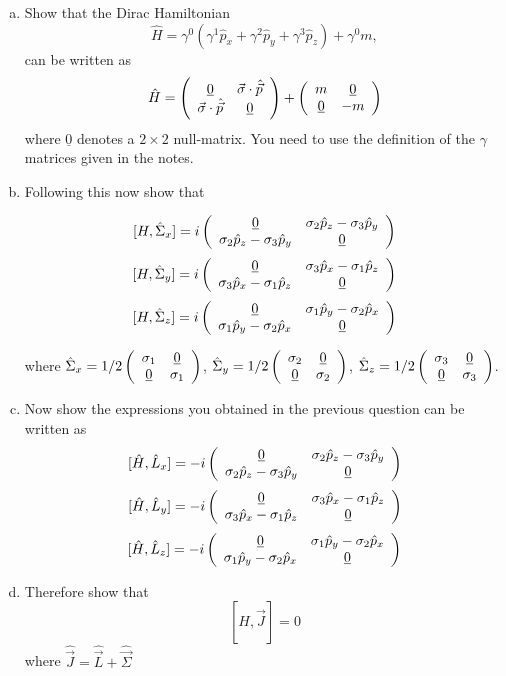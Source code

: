 \begin{enumerate}[(a)]
\item Show that the Dirac Hamiltonian
\[ \hat{H} = \gamma^{0}(\gamma^1\hat{p}_x+ \gamma^2\hat{p}_y + \gamma^3\hat{p}_z)+\gamma^{0}m, \]
can be written as
\[
\hat{H}= \left( \begin{array}{cc} \underline{0} & \vec{\sigma}\cdot\hat{\vec{p}} \\ \vec{\sigma}\cdot\hat{\vec{p}} & \underline{0} \end{array} \right)+
 \left( \begin{array}{cc} m & \underline{0} \\ \underline{0} & -m \end{array} \right)
\]
where $\underline{0}$ denotes a $2\times2$ null-matrix.
You need to use the definition of the $\gamma$ matrices given in the notes.

\item Following this now show that

\[ [H,\hat{\Sigma}_x]=i \left( \begin{array}{cc} \underline{0} & \sigma_2\hat{p}_{z}-\sigma_3\hat{p}_{y} \\ \sigma_2\hat{p}_{z}-\sigma_3\hat{p}_{y} & \underline{0} \end{array} \right) \]
\[ [H,\hat{\Sigma}_y]=i \left( \begin{array}{cc} \underline{0} & \sigma_3\hat{p}_{x}-\sigma_1\hat{p}_{z} \\ \sigma_3\hat{p}_{x}-\sigma_1\hat{p}_{z} & \underline{0} \end{array} \right) \]
\[ [H,\hat{\Sigma}_z]=i \left( \begin{array}{cc} \underline{0} & \sigma_1\hat{p}_{y}-\sigma_2\hat{p}_{x} \\ \sigma_1\hat{p}_{y}-\sigma_2\hat{p}_{x} & \underline{0} \end{array} \right) \]

where $\hat{\Sigma}_{x}=1/2 \left( \begin{array}{cc} \sigma_{1} & \underline{0} \\ \underline{0} & \sigma_{1} \end{array} \right)$, 
$\hat{\Sigma}_{y}=1/2 \left( \begin{array}{cc} \sigma_{2} & \underline{0} \\ \underline{0} & \sigma_{2} \end{array} \right)$, 
$\hat{\Sigma}_{z}=1/2 \left( \begin{array}{cc} \sigma_{3} & \underline{0} \\ \underline{0} & \sigma_{3} \end{array} \right)$. 

\item Now show the expressions you obtained in the previous question can be written as
\[
 [\hat{H},\hat{L}_x]  = -i \left( \begin{array}{cc} \underline{0} & \sigma_2\hat{p}_{z}-\sigma_3\hat{p}_{y} \\ \sigma_2\hat{p}_{z}-\sigma_3\hat{p}_{y} & \underline{0} \end{array} \right)
\]                                                                                                                             
\[                                                                                                                             
  [\hat{H},\hat{L}_y] = -i \left( \begin{array}{cc} \underline{0} & \sigma_3\hat{p}_{x}-\sigma_1\hat{p}_{z} \\ \sigma_3\hat{p}_{x}-\sigma_1\hat{p}_{z} & \underline{0} \end{array} \right)
\]                                                                                                                             
\[                                                                                                                             
 [\hat{H},\hat{L}_z]  = -i \left( \begin{array}{cc} \underline{0} & \sigma_1\hat{p}_{y}-\sigma_2\hat{p}_{x} \\ \sigma_1\hat{p}_{y}-\sigma_2\hat{p}_{x} & \underline{0} \end{array} \right)
 \]

\item Therefore show that
  \[[H,\hat{\vec{J}}]=0\]
    where $\hat{\vec{J}}=\hat{\vec{L}}+\hat{\vec{\Sigma}}$
    
\end{enumerate}
\answerbox{

}

